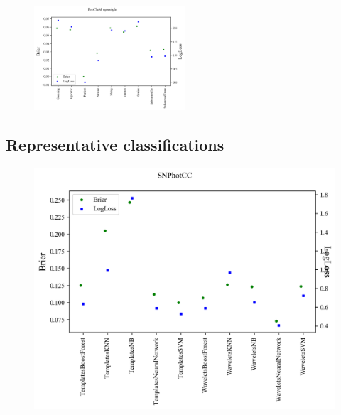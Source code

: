 \begin{figure}
	\begin{center}
		\includegraphics[width=0.5\textwidth]{./fig/multi_metric_up.png}
		\caption{}
		\label{fig:plasticc_up}
	\end{center}
\end{figure}

\subsection{Representative classifications}
\label{sec:realresults}

\begin{figure}
	\begin{center}
		\includegraphics[width=\textwidth]{./fig/SNPhotCC_res.png}
		\caption{}
		\label{fig:snphotcc_metric_compare}
	\end{center}
\end{figure}

